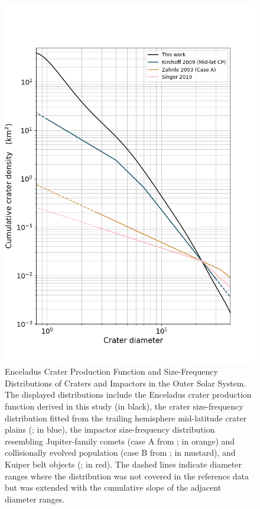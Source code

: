 \documentclass[preprint,12pt,3p,times,authoryear]{elsarticle}
\begin{document}
\begin{figure}
    \centering
    \includegraphics[width=0.5\linewidth]{compare_enc_terrains_degpoly_FigS3.png}
    \caption{Enceladus Crater Production Function and Size-Frequency Distributions of Craters and Impactors in the Outer Solar System. The displayed distributions include the Enceladus crater production function derived in this study (in black), the crater size-frequency distribution fitted from the trailing hemisphere mid-latitude crater plains (\citet{Kirchoff2009}; in blue), the impactor size-frequency distribution resembling Jupiter-family comets (case A from \citet{Zahnle2003}; in orange) and collisionally evolved population (case B from \citet{Zahnle2003}; in mustard), and Kuiper belt objects (\citet{Singer2019}; in red). The dashed lines indicate diameter ranges where the distribution was not covered in the reference data but was extended with the cumulative slope of the adjacent diameter ranges.}
    \label{fig:placeholder}
\end{figure}
\end{document}
